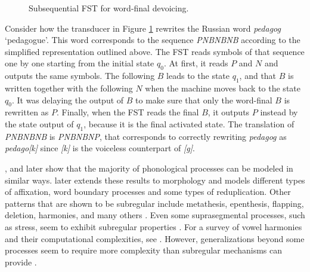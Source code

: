 \begin{figure}[h!] 
\centering
{}
\caption{Subsequential FST for word-final devoicing.}
\label{ssqwfdddd}
\end{figure}

Consider how the transducer in Figure \ref{ssqwfdddd} rewrites the Russian word \emph{pedagog} `pedagogue'.
This word corresponds to the sequence  \emph{PNBNBNB} according to the simplified representation outlined above.
The FST reads symbols of that sequence one by one starting from the initial state $q_0$.
At first, it reads $P$ and $N$ and outputs the same symbols.
The following $B$ leads to the state $q_{1}$, and that $B$ is written together with the following $N$ when the machine moves back to the state $q_0$.
It was delaying the output of $B$ to make sure that only the word-final $B$ is rewritten as $P$.
Finally, when the FST reads the final $B$, it outputs $P$ instead by the state output of $q_{1}$, because it is the final activated state.
The translation of \emph{PNBNBNB} is \emph{PNBNBNP}, that corresponds to correctly rewriting \emph{pedagog} as \emph{pedago[k]} since \emph{[k]} is the voiceless counterpart of \emph{[g]}.


\cite{Chandlee2014}, and later \cite{ChandleeHeinz2018} show that the majority of phonological processes can be modeled in similar ways.
\cite{Chandlee2017} later extends these results to morphology and models different types of affixation, word boundary processes and some types of reduplication.
Other patterns that are shown to be subregular include metathesis, epenthesis, flapping, deletion, harmonies, and many others \citep{Chandlee2014}.
Even some suprasegmental processes, such as stress, seem to exhibit subregular properties \citep{RogersPres}.
For a survey of vowel harmonies and their computational complexities, see \citep{GainorLai12}.
However, generalizations beyond some processes seem to require more complexity than subregular mechanisms can provide \citep{DolatianHeinz2018}.

